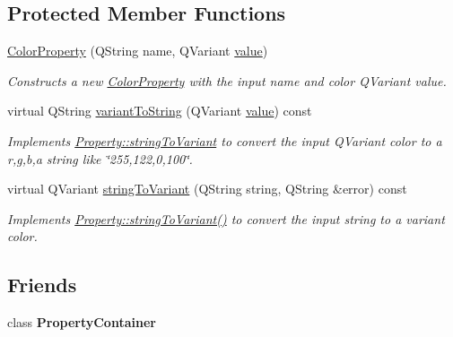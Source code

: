 \subsection*{Protected Member Functions}
\begin{DoxyCompactItemize}
\item 
\hypertarget{class_picto_1_1_color_property_a4d51a5ca057cc06d787ae542aff8c930}{\hyperlink{class_picto_1_1_color_property_a4d51a5ca057cc06d787ae542aff8c930}{Color\-Property} (Q\-String name, Q\-Variant \hyperlink{class_picto_1_1_property_a69540c9d4f9a4b0b128b4c6a876d67ca}{value})}\label{class_picto_1_1_color_property_a4d51a5ca057cc06d787ae542aff8c930}

\begin{DoxyCompactList}\small\item\em Constructs a new \hyperlink{class_picto_1_1_color_property}{Color\-Property} with the input name and color Q\-Variant value. \end{DoxyCompactList}\item 
\hypertarget{class_picto_1_1_color_property_a70dc856281122de27ff0ab73a1cc3940}{virtual Q\-String \hyperlink{class_picto_1_1_color_property_a70dc856281122de27ff0ab73a1cc3940}{variant\-To\-String} (Q\-Variant \hyperlink{class_picto_1_1_property_a69540c9d4f9a4b0b128b4c6a876d67ca}{value}) const }\label{class_picto_1_1_color_property_a70dc856281122de27ff0ab73a1cc3940}

\begin{DoxyCompactList}\small\item\em Implements \hyperlink{class_picto_1_1_property_a97d52011d6db190c5c28a21d76ac1d3b}{Property\-::string\-To\-Variant} to convert the input Q\-Variant color to a r,g,b,a string like \char`\"{}255,122,0,100\char`\"{}. \end{DoxyCompactList}\item 
virtual Q\-Variant \hyperlink{class_picto_1_1_color_property_a71e157fd5122482f81926f17d7f1373b}{string\-To\-Variant} (Q\-String string, Q\-String \&error) const 
\begin{DoxyCompactList}\small\item\em Implements \hyperlink{class_picto_1_1_property_a97d52011d6db190c5c28a21d76ac1d3b}{Property\-::string\-To\-Variant()} to convert the input string to a variant color. \end{DoxyCompactList}\end{DoxyCompactItemize}
\subsection*{Friends}
\begin{DoxyCompactItemize}
\item 
\hypertarget{class_picto_1_1_color_property_a7ff968ca40027b2b0500a9260b463e3a}{class {\bfseries Property\-Container}}\label{class_picto_1_1_color_property_a7ff968ca40027b2b0500a9260b463e3a}

\end{DoxyCompactItemize}
